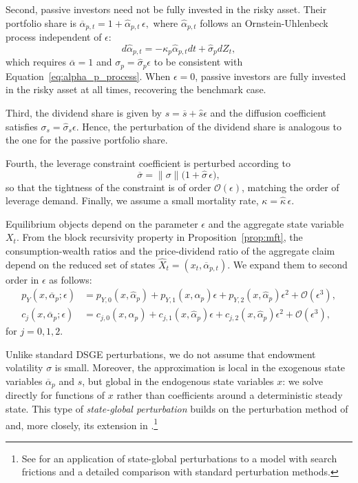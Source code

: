 \documentclass[12pt,english]{article}
\begin{document}
Second, passive investors need not be fully invested in the risky asset.
Their portfolio share is  $\overline{\alpha}_{p,t}=1+\hat{\alpha}_{p,t}\,\epsilon,$ where $\hat{\alpha}_{p,t}$ follows an Ornstein-Uhlenbeck process independent of $\epsilon$:
\begin{equation}\label{eq:apbar_index}
    d \hat{\alpha}_{p,t} = -\kappa_p \hat{\alpha}_{p,t} dt + \hat{\sigma}_p d Z_t,
\end{equation}
which requires $\overline{\alpha} = 1$ and $\sigma_p = \hat{\sigma}_p \epsilon$ to be consistent with Equation~\eqref{eq:alpha_p_process}.
When $\epsilon=0$, passive investors are fully invested in the risky asset at all times, recovering the benchmark case.

Third, the dividend share is given by $s = \overline{s} + \hat{s} \epsilon$ and the diffusion coefficient satisfies $\sigma_s = \hat{\sigma}_s \epsilon$. 
Hence, the perturbation of the dividend share is analogous to the one for the passive portfolio share.

Fourth, the leverage constraint coefficient is perturbed according to
\begin{equation}\label{eq:sig_bar-perturb}
    \overline{\sigma}=\|\sigma\|\big(1+\hat{\sigma}\,\epsilon\big),
\end{equation}
so that the tightness of the constraint is of order $\mathcal{O}(\epsilon)$, matching the order of leverage demand.
Finally, we assume a small mortality rate, $\kappa=\hat{\kappa}\,\epsilon$.

Equilibrium objects depend on the parameter $\epsilon$ and the aggregate state variable $X_t$.
From the block recursivity property in Proposition~\ref{prop:mft}, the consumption-wealth ratios and the price-dividend ratio of the aggregate claim depend on the reduced set of states $\hat{X}_t = (x_{t}, \overline{\alpha}_{p,t})$.
We expand them to second order in $\epsilon$ as follows:
\begin{align}
    p_Y(x, \overline{\alpha}_p;\epsilon) &= p_{Y,0}(x, \hat{\alpha}_p) + p_{Y,1}(x, \hat{\alpha}_p)\epsilon + p_{Y,2}(x, \hat{\alpha}_p)\epsilon^2 + \mathcal{O}(\epsilon^3), \\
    c_j(x, \overline{\alpha}_p;\epsilon) &= c_{j,0}(x, \hat{\alpha}_p) + c_{j,1}(x, \hat{\alpha}_p)\epsilon + c_{j,2}(x, \hat{\alpha}_p)\epsilon^2 + \mathcal{O}(\epsilon^3), 
\end{align}
for $j = 0, 1, 2$. 

Unlike standard DSGE perturbations, we do not assume that endowment volatility $\sigma$ is small.
Moreover, the approximation is local in the exogenous state variables $\overline{\alpha}_p$ and $s$, but global in the endogenous state variables $x$:
we solve directly for functions of $x$ rather than coefficients around a deterministic steady state.
This type of \emph{state-global perturbation} builds on the perturbation method of \citet{kogan2001risk} and, more closely, its extension in \citet{Silva/riskchannel}.\footnote{See \citet{kargar2020competitive} for an application of state-global perturbations to a model with search frictions and a detailed comparison with standard perturbation methods.}
\end{document}
